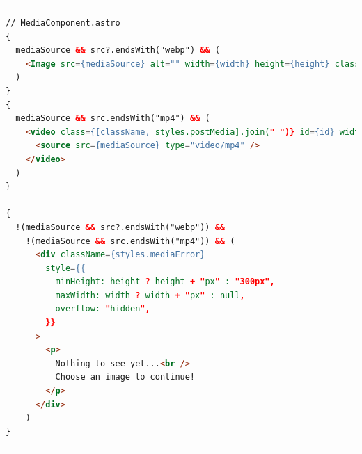 \documentclass[a4paper, 12pt]{article}
\begin{document}
\vspace{0.5cm} \hrule \vspace{0.5cm}

\begin{lstlisting}[caption=MediaComponent in pure Astro (Template), label={lst:Astro:MediaComponent:Template}, language=HTML, firstnumber=29]
// MediaComponent.astro
{
  mediaSource && src?.endsWith("webp") && (
    <Image src={mediaSource} alt="" width={width} height={height} class={[className, styles.postMedia].join(" ")} id={id} loading={priority ? "eager" : "lazy"} {...rest} />
  )
}
{
  mediaSource && src.endsWith("mp4") && (
    <video class={[className, styles.postMedia].join(" ")} id={id} width={width} preload="metadata" controls controlslist="nodownload,nofullscreen,noremoteplayback" disable-picture-in-picture loop muted >
      <source src={mediaSource} type="video/mp4" />
    </video>
  )
}

{
  !(mediaSource && src?.endsWith("webp")) &&
    !(mediaSource && src.endsWith("mp4")) && (
      <div className={styles.mediaError}
        style={{
          minHeight: height ? height + "px" : "300px",
          maxWidth: width ? width + "px" : null,
          overflow: "hidden",
        }}
      >
        <p>
          Nothing to see yet...<br />
          Choose an image to continue!
        </p>
      </div>
    )
}
\end{lstlisting}

\vspace{0.5cm} \hrule \vspace{0.5cm}
\end{document}

